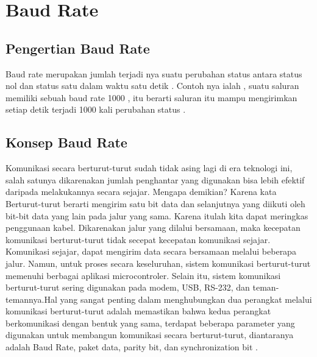 
\section{Baud Rate}

\subsection {Pengertian Baud Rate}
	Baud rate merupakan jumlah terjadi nya suatu perubahan status antara status nol dan status satu dalam waktu satu detik . Contoh nya ialah , suatu saluran memiliki sebuah baud rate 1000 , itu berarti saluran itu mampu mengirimkan setiap detik terjadi 1000 kali perubahan status  .
	
\subsection{Konsep Baud Rate}
Komunikasi secara berturut-turut sudah tidak asing lagi di era teknologi ini, salah satunya dikarenakan jumlah penghantar yang digunakan bisa lebih efektif daripada melakukannya secara sejajar. Mengapa demikian? Karena kata Berturut-turut berarti mengirim satu bit data dan selanjutnya yang diikuti oleh bit-bit data yang lain pada jalur yang sama. Karena itulah kita dapat meringkas penggunaan kabel. Dikarenakan jalur yang dilalui bersamaan, maka kecepatan komunikasi berturut-turut tidak secepat kecepatan komunikasi sejajar. Komunikasi sejajar, dapat mengirim data secara bersamaan melalui beberapa jalur. Namun, untuk proses secara keseluruhan, sistem komunikasi berturut-turut memenuhi berbagai aplikasi microcontroler. Selain itu, sistem komunikasi berturut-turut sering digunakan pada modem, USB, RS-232, dan teman-temannya.Hal yang sangat penting dalam menghubungkan dua perangkat melalui komunikasi berturut-turut adalah memastikan bahwa kedua perangkat berkomunikasi dengan bentuk yang sama, terdapat beberapa parameter yang digunakan untuk membangun komunikasi secara berturut-turut, diantaranya adalah Baud Rate, paket data, parity bit, dan synchronization bit .

